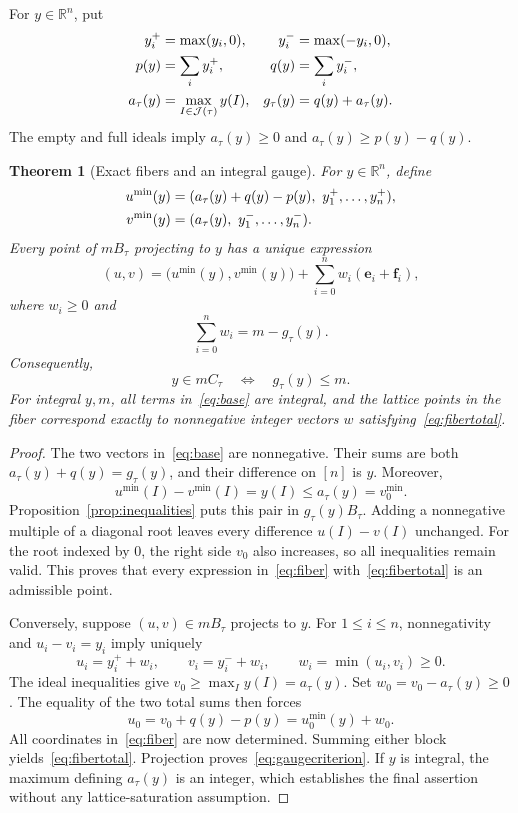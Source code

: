 \documentclass[11pt]{article}
\numberwithin{equation}{section}
\newtheorem{theorem}{Theorem}[section]
\theoremstyle{definition}
\newcommand{\R}{\mathbb R}
\newcommand{\J}{\mathcal J(\tau)}
\newcommand{\ee}{\mathbf e}
\newcommand{\ff}{\mathbf f}
\begin{document}
For $y\in\R^n$, put
\begin{align}
 y_i^+&=\max(y_i,0),&y_i^-&=\max(-y_i,0),\notag\\
 p(y)&=\sum_i y_i^+,&q(y)&=\sum_i y_i^-,\label{eq:pq}\\
 a_\tau(y)&=\max_{I\in\J}y(I),&
 g_\tau(y)&=q(y)+a_\tau(y).\label{eq:gauge}
\end{align}
The empty and full ideals imply
$a_\tau(y)\geq0$ and $a_\tau(y)\geq p(y)-q(y)$.

\begin{theorem}[Exact fibers and an integral gauge]\label{thm:fibers}
For $y\in\R^n$, define
\begin{align}
 u^{\min}(y)&=(a_\tau(y)+q(y)-p(y),\ y_1^+,\ldots,y_n^+),\notag\\
 v^{\min}(y)&=(a_\tau(y),\ y_1^-,\ldots,y_n^-).\label{eq:base}
\end{align}
Every point of $mB_\tau$ projecting to $y$ has a unique expression
\begin{equation}
 (u,v)=\bigl(u^{\min}(y),v^{\min}(y)\bigr)
        +\sum_{i=0}^{n}w_i(\ee_i+\ff_i),\label{eq:fiber}
\end{equation}
where $w_i\geq0$ and
\begin{equation}
 \sum_{i=0}^{n}w_i=m-g_\tau(y).\label{eq:fibertotal}
\end{equation}
Consequently,
\begin{equation}
 y\in mC_\tau\quad\Longleftrightarrow\quad g_\tau(y)\leq m.\label{eq:gaugecriterion}
\end{equation}
For integral $y,m$, all terms in~\eqref{eq:base} are integral, and the lattice
points in the fiber correspond exactly to nonnegative integer vectors $w$
satisfying~\eqref{eq:fibertotal}.
\end{theorem}
\begin{proof}
The two vectors in~\eqref{eq:base} are nonnegative. Their sums are both
$a_\tau(y)+q(y)=g_\tau(y)$, and their difference on $[n]$ is $y$. Moreover,
\[
 u^{\min}(I)-v^{\min}(I)=y(I)\leq a_\tau(y)=v^{\min}_0.
\]
Proposition~\ref{prop:inequalities} puts this pair in $g_\tau(y)B_\tau$.
Adding a nonnegative multiple of a diagonal root leaves every difference
$u(I)-v(I)$ unchanged. For the root indexed by $0$, the right side $v_0$ also
increases, so all inequalities remain valid. This proves that every expression
in~\eqref{eq:fiber} with~\eqref{eq:fibertotal} is an admissible point.

Conversely, suppose $(u,v)\in mB_\tau$ projects to $y$. For $1\leq i\leq n$,
nonnegativity and $u_i-v_i=y_i$ imply uniquely
\[
 u_i=y_i^++w_i,\qquad v_i=y_i^-+w_i,\qquad
 w_i=\min(u_i,v_i)\geq0.
\]
The ideal inequalities give $v_0\geq\max_I y(I)=a_\tau(y)$. Set
$w_0=v_0-a_\tau(y)\geq0$. The equality of the two total sums then forces
\[
 u_0=v_0+q(y)-p(y)=u^{\min}_0(y)+w_0.
\]
All coordinates in~\eqref{eq:fiber} are now determined. Summing either block
yields~\eqref{eq:fibertotal}. Projection proves~\eqref{eq:gaugecriterion}.
If $y$ is integral, the maximum defining $a_\tau(y)$ is an integer, which
establishes the final assertion without any lattice-saturation assumption.
\end{proof}
\end{document}
